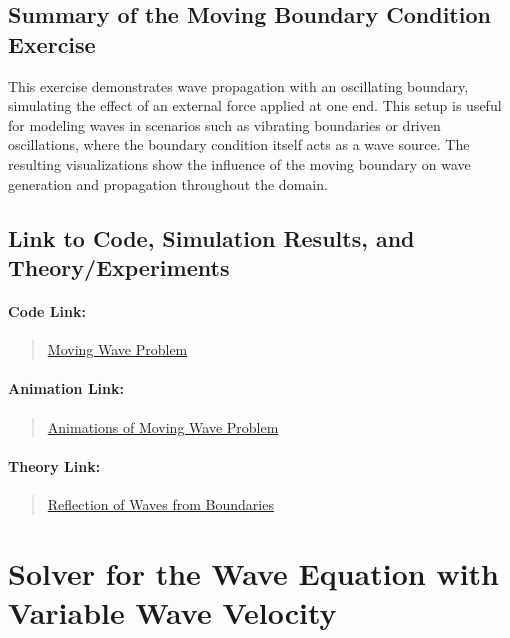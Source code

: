 \documentclass{article}
\begin{document}
			\subsection{Summary of the Moving Boundary Condition Exercise}
			
			This exercise demonstrates wave propagation with an oscillating boundary, simulating the effect of an external force applied at one end. This setup is useful for modeling waves in scenarios such as vibrating boundaries or driven oscillations, where the boundary condition itself acts as a wave source. The resulting visualizations show the influence of the moving boundary on wave generation and propagation throughout the domain.
	
			\subsection{Link to Code, Simulation Results, and Theory/Experiments}
			
			
			\paragraph{Code Link:}
			\begin{quote}
				\href{https://github.com/pb96git/Numerical-Solutions-for-Partial-Differential-Equations/blob/main/Part_2_WaveEquation/Example_Codes/moving_wave.py}{Moving Wave Problem}
			\end{quote}
			
			\paragraph{Animation Link:}
			\begin{quote}
				\href{https://github.com/pb96git/Numerical-Solutions-for-Partial-Differential-Equations/tree/main/Part_2_WaveEquation/Animations_postProcessing/moving_wave}{Animations of Moving Wave Problem}
			\end{quote}
			
			\paragraph{Theory Link:}
			\begin{quote}
				\href{https://www.acs.psu.edu/drussell/demos/reflect/reflect.html}{Reflection of Waves from Boundaries}
			\end{quote}
	
			
	\section{Solver for the Wave Equation with Variable Wave Velocity}
	
\end{document}

